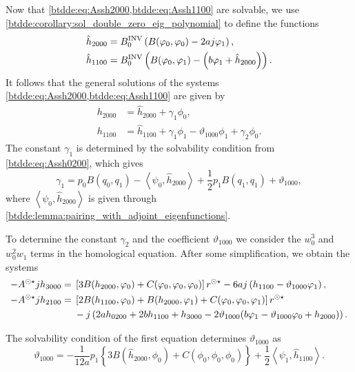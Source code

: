 Now that \cref{btdde:eq:Assh2000,btdde:eq:Assh1100} are solvable, we use
\cref{btdde:corollary:sol_double_zero_eig_polynomial} to define the functions
\begin{align*}
\hat h_{2000} & = B^{\mathrm{INV}}_{0} \left( B(\varphi_0,\varphi_0) - 2aj\varphi_1 \right), \\
\hat h_{1100} & = B^{\mathrm{INV}}_{0} \left( B(\varphi_0,\varphi_1) - \left(b\varphi_1 + \hat h_{2000}\right) \right).
\end{align*}
It follows that the general solutions of the systems \cref{btdde:eq:Assh2000,btdde:eq:Assh1100}
are given by
\begin{align*}
h_{2000} &= \hat h_{2000} + \gamma_1 \phi_0, \\
h_{1100} &= \hat h_{1100} + \gamma_1 \phi_1 - \vartheta_{1000} \phi_1 + \gamma_2 \phi_0.
\end{align*}
The constant $\gamma_1$ is determined by the solvability condition from \cref{btdde:eq:Assh0200}, which gives
\begin{equation*}
\gamma_1 = p_0  B(q_0,q_1) - \left< \psi_0, \hat h_{2000} \right> 
								+ \frac12 p_1 B(q_1,q_1) + \vartheta_{1000},
\end{equation*}
where $\left< \psi_0,\hat h_{2000}\right>$ is given through \cref{btdde:lemma:pairing_with_adjoint_eigenfunctions}.

To determine the constant $\gamma_2$ and the coefficient $\vartheta_{1000}$ we
consider the $w_0^3$ and $w_0^2w_1$ terms in the homological equation. After
some simplification, we obtain the systems
\begin{align}
\label{btdde:eq:Assh3000}
-A^{\odot\star} jh_{3000} ={}& \left[3 B(h_{2000},\varphi_0) + C(\varphi_0,\varphi_0,\varphi_0)\right]r^{\odot\star} 
                            - 6a j\left( h_{1100} - \vartheta_{1000} \varphi_1 \right), \\
\label{btdde:eq:Assh2100}
-A^{\odot\star} jh_{2100} ={}& \left[2 B(h_{1100},\varphi_0) + B(h_{2000},\varphi_1) + C(\varphi_0,\varphi_0,\varphi_1)\right]r^{\odot\star} \\
                         & - j \left( 2 a h_{0200} + 2 b h_{1100} + h_{3000} 
                            - 2 \vartheta_{1000} (b\varphi_1 - \vartheta_{1000}\varphi_0 +h_{2000})\right).
\end{align}

The solvability condition of the first equation determines $\vartheta_{1000}$ as
\begin{equation}
\label{btdde:eq:theta1000}
\vartheta_{1000} = -\frac1{12a} p_1 \left\{ 
			3B(\hat h_{2000},\phi_0) + C(\phi_0,\phi_0,\phi_0)
            \right\} + \frac12 \left< \psi_1, \hat h_{1100} \right>.
\end{equation}

